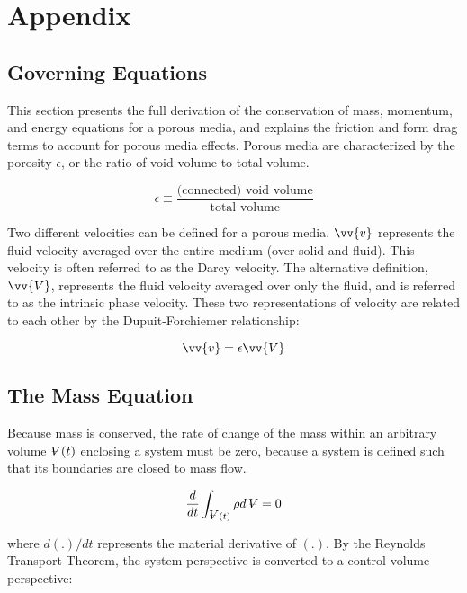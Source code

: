 \documentclass[10pt]{article}
\newcommand{\volume}{\mathop{\ooalign{\hfil$V$\hfil\cr\kern0.08em--\hfil\cr}}\nolimits}
\numberwithin{equation}{section} %
\begin{document}
\clearpage
\section{Appendix}
\subsection{Governing Equations}
\label{sec:GoverningEquations}

This section presents the full derivation of the conservation of mass, momentum, and energy equations for a porous media, and explains the friction and form drag terms to account for porous media effects. Porous media are characterized by the porosity \(\epsilon\), or the ratio of void volume to total volume.

\begin{equation}
\label{eq:PorosityDefinition}
\epsilon\equiv\frac{\textrm{(connected) void volume}}{\textrm{total volume}}
\end{equation}

Two different velocities can be defined for a porous media. \(\vv{v}\) represents the fluid velocity averaged over the entire medium (over solid and fluid). This velocity is often referred to as the Darcy velocity. The alternative definition, \(\vv{V}\), represents the fluid velocity averaged over only the fluid, and is referred to as the intrinsic phase velocity. These two representations of velocity are related to each other by the Dupuit-Forchiemer relationship:

\begin{equation}
\label{eq:DupuitForchiemer}
\vv{v}=\epsilon\vv{V}
\end{equation}

\subsection{The Mass Equation}
\label{sec:ContinuityEqnPebbleBed}

Because mass is conserved, the rate of change of the mass within an arbitrary volume \(\volume(t)\) enclosing a system must be zero, because a system is defined such that its boundaries are closed to mass flow.

\begin{equation}
\frac{d}{dt} \int_{\volume(t)}^{}\rho d\volume=0
\end{equation}

where \(d(.)/dt\) represents the material derivative of \((.)\). By the Reynolds Transport Theorem, the system perspective is converted to a control volume perspective:
\end{document}
